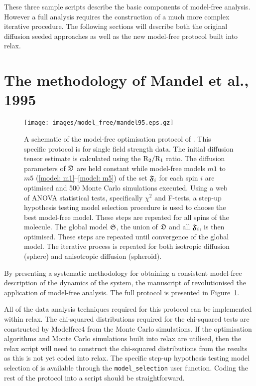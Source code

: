\begin{htmlonly}
\begin{htmlonly}
These three sample scripts describe the basic components of model-free analysis.  However a full analysis requires the construction of a much more complex iterative procedure.  The following sections will describe both the original diffusion seeded approaches as well as the new model-free protocol built into relax.



\section{The methodology of Mandel et al., 1995}
\label{sect: Mandel 1995}

\begin{figure}
\centerline{\texttt{[image: images/model\_free/mandel95.eps.gz]}}
\caption[A schematic of the model-free optimisation protocol of Mandel et al., 1995]{A schematic of the model-free optimisation protocol of \citet{Mandel95}.  This specific protocol is for single field strength data.  The initial diffusion tensor estimate is calculated using the $\mathrm{R}_2/\mathrm{R}_1$ ratio.  The diffusion parameters of $\mathfrak{D}$ are held constant while model-free models $m1$ to $m5$ (\ref{model: m1}--\ref{model: m5}) of the set $\mathfrak{F}_i$ for each spin $i$ are optimised and 500 Monte Carlo simulations executed.  Using a web of ANOVA statistical tests, specifically $\chi^2$ and F-tests, a step-up hypothesis testing model selection procedure is used to choose the best model-free model.  These steps are repeated for all spins of the molecule.  The global model $\mathfrak{S}$, the union of $\mathfrak{D}$ and all $\mathfrak{F}_i$, is then optimised.  These steps are repeated until convergence of the global model.  The iterative process is repeated for both isotropic diffusion (sphere) and anisotropic diffusion (spheroid).} \label{fig: Mandel et al.}
\end{figure}

By presenting a systematic methodology for obtaining a consistent model-free description of the dynamics of the system, the manuscript of \citet{Mandel95} revolutionised the application of model-free analysis.  The full protocol is presented in Figure~\ref{fig: Mandel et al.}.

All of the data analysis techniques required for this protocol can be implemented within relax.  The chi-squared distributions required for the chi-squared tests are constructed by Modelfree4 from the Monte Carlo simulations.  If the optimisation algorithms and Monte Carlo simulations built into relax are utilised, then the relax script will need to construct the chi-squared distributions from the results as this is not yet coded into relax.  The specific step-up hypothesis testing model selection of \citet{Mandel95} is available through the \texttt{model\_selection} user function.  Coding the rest of the protocol into a script should be straightforward.


\end{htmlonly}
\end{htmlonly}
